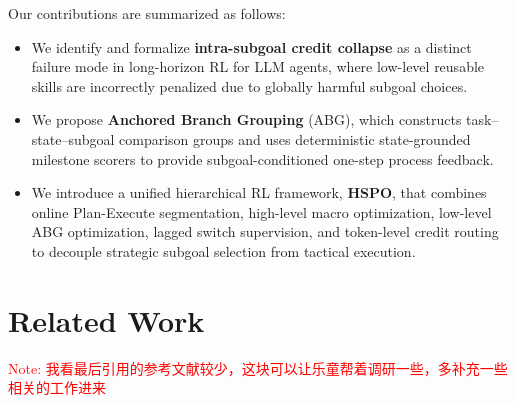 \documentclass{article}
\newcommand{\wei}[1]{\textcolor{red}{#1}}
\begin{document}
Our contributions are summarized as follows:
\begin{itemize}
    \item We identify and formalize \textbf{intra-subgoal credit collapse} as a distinct failure mode in long-horizon RL for LLM agents, where low-level reusable skills are incorrectly penalized due to globally harmful subgoal choices.
    \item We propose \textbf{Anchored Branch Grouping} (ABG), which constructs task--state--subgoal comparison groups and uses deterministic state-grounded milestone scorers to provide subgoal-conditioned one-step process feedback.
    \item We introduce a unified hierarchical RL framework, \textbf{HSPO}, that combines online Plan-Execute segmentation, high-level macro optimization, low-level ABG optimization, lagged switch supervision, and token-level credit routing to decouple strategic subgoal selection from tactical execution.
\end{itemize}



\section{Related Work} \wei{Note: 我看最后引用的参考文献较少，这块可以让乐童帮着调研一些，多补充一些相关的工作进来}
\label{sec:relwork}

\end{document}
